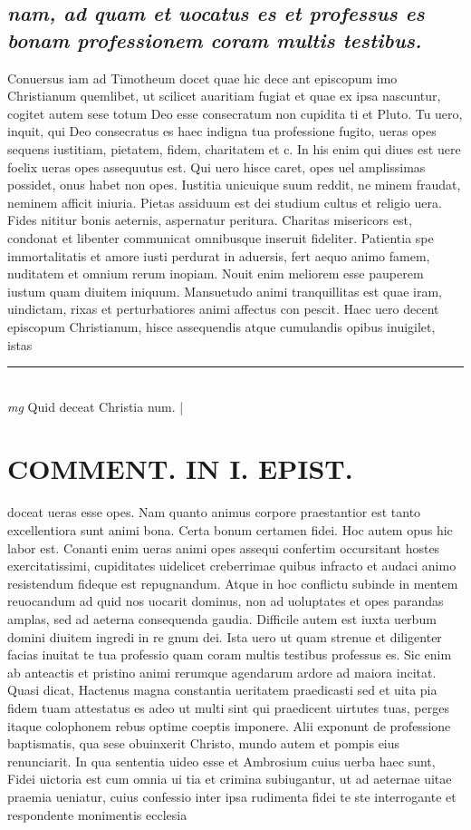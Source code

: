 \documentclass{article}
\begin{document}
\begin{pages}
\subsection*{\textit{nam, ad quam et uocatus es et professus es bonam professionem coram multis testibus. }}\pstart Conuersus iam ad Timotheum docet quae hic dece ant episcopum imo Christianum quemlibet, ut scilicet auaritiam fugiat et quae ex ipsa nascuntur, cogitet autem sese totum Deo esse consecratum non cupidita ti et Pluto. Tu uero, inquit, qui Deo consecratus es haec indigna tua professione fugito, ueras opes sequens iustitiam, pietatem, fidem, charitatem et c. In his enim qui diues est uere foelix ueras opes assequutus est. Qui uero hisce caret, opes uel amplissimas possidet, onus habet non opes. Iustitia unicuique suum reddit, ne minem fraudat, neminem afficit iniuria. Pietas assiduum est dei studium cultus et religio uera. Fides nititur bonis aeternis, aspernatur peritura. Charitas misericors est, condonat et libenter communicat omnibusque inseruit fideliter. Patientia spe immortalitatis et amore iusti perdurat in aduersis, fert aequo animo famem, nuditatem et omnium rerum inopiam. Nouit enim meliorem esse pauperem iustum quam diuitem iniquum. Mansuetudo animi tranquillitas est quae iram, uindictam, rixas et perturbatiores animi affectus con pescit. Haec uero decent episcopum Christianum, hisce assequendis atque cumulandis opibus inuigilet, istas  \pend
\vspace{0.5cm}\noindent
\vspace{0.2cm}\rule{1cm}{0.2pt}\\ 
\hspace{0.2cm}\textit{mg}
\footnotesize Quid deceat Christia num. 
\normalsize| 
\section*{COMMENT. IN I. EPIST. }\pstart doceat ueras esse opes. Nam quanto animus corpore praestantior est tanto excellentiora sunt animi bona. Certa bonum certamen fidei. Hoc autem opus hic labor est. Conanti enim ueras animi opes assequi confertim occursitant hostes exercitatissimi, cupiditates uidelicet creberrimae quibus infracto et audaci animo resistendum fideque est repugnandum. Atque in hoc conflictu subinde in mentem reuocandum ad quid nos uocarit dominus, non ad uoluptates et opes parandas amplas, sed ad aeterna consequenda gaudia. Difficile autem est iuxta uerbum domini diuitem ingredi in re gnum dei. Ista uero ut quam strenue et diligenter facias inuitat te tua professio quam coram multis testibus professus es. Sic enim ab anteactis et pristino animi rerumque agendarum ardore ad maiora incitat. Quasi dicat, Hactenus magna constantia ueritatem praedicasti sed et uita pia fidem tuam attestatus es adeo ut multi sint qui praedicent uirtutes tuas, perges itaque colophonem rebus optime coeptis imponere. Alii exponunt de professione baptismatis, qua sese obuinxerit Christo, mundo autem et pompis eius renunciarit. In qua sententia uideo esse et Ambrosium cuius uerba haec sunt, Fidei uictoria est cum omnia ui tia et crimina subiugantur, ut ad aeternae uitae praemia ueniatur, cuius confessio inter ipsa rudimenta fidei te ste interrogante et respondente monimentis ecclesia  \pend

\end{pages}
\end{document}
